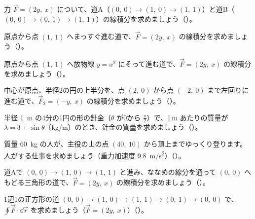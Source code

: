 \bkproblem 力 $\vec F=(2y,\ x)$ について、道A（$(0,\ 0)\to(1,\ 0)\to(1,\ 1)$）と道B（$(0,\ 0)\to(0,\ 1)\to(1,\ 1)$）の線積分を求めましょう\mbox{（）}。

\bkproblem 原点から点 $(1,\ 1)$ へまっすぐ進む道で、$\vec F=(2y,\ x)$ の線積分を求めましょう\mbox{（）}。

\bkproblem 原点から点 $(1,\ 1)$ へ放物線 $y=x^2$ にそって進む道で、$\vec F=(2y,\ x)$ の線積分を求めましょう\mbox{（）}。

\bkproblem 中心が原点、半径2の円の上半分を、点 $(2,\ 0)$ から点 $(-2,\ 0)$ まで左回りに進む道で、$\vec F_2=(-y,\ x)$ の線積分を求めましょう\mbox{（）}。

\bkproblem 半径 \qty{1}{m} の4分の1円の形の針金（$\theta$ が0から $\frac{\pi}{2}$）で、1\,m あたりの質量が $\lambda=3+\sin\theta$〔kg/m〕のとき、針金の質量を求めましょう\mbox{（）}。

\bkproblem 質量 \qty{60}{kg} の人が、主役の山の点 $(40,\ 10)$ から頂上までゆっくり登ります。人がする仕事を求めましょう（重力加速度 \qty{9.8}{m/s^2}）\mbox{（）}。


\bkproblem 道Aで $(0,\ 0)\to(1,\ 0)\to(1,\ 1)$ と進み、ななめの線分を通って $(0,\ 0)$ へもどる三角形の道で、$\vec F=(2y,\ x)$ の線積分を求めましょう\mbox{（）}。

\bkproblem 1辺1の正方形の道 $(0,\ 0)\to(1,\ 0)\to(1,\ 1)\to(0,\ 1)\to(0,\ 0)$ で、$\oint\vec F\cdot\dd\vec r$ を求めましょう（$\vec F=(2y,\ x)$）\mbox{（）}。

